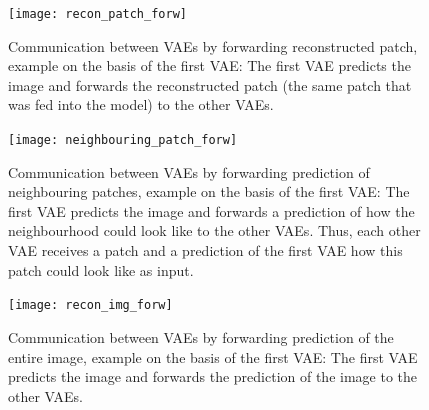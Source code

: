 \begin{figure}
    \centering
    \texttt{[image: recon\_patch\_forw]}
    \caption[Communication between VAEs by forwarding reconstructed patch]{Communication between VAEs by forwarding reconstructed patch, example on the basis of the first VAE: The first VAE predicts the image and forwards the reconstructed patch (the same patch that was fed into the model) to the other VAEs.}
\end{figure}

\begin{figure}
    \centering
    \texttt{[image: neighbouring\_patch\_forw]}
    \caption[Communication between VAEs by forwarding prediction of neighbouring patches]{Communication between VAEs by forwarding prediction of neighbouring patches, example on the basis of the first VAE: The first VAE predicts the image and forwards a prediction of how the neighbourhood could look like to the other VAEs. Thus, each other VAE receives a patch and a prediction of the first VAE how this patch could look like as input.}
\end{figure}

\begin{figure}
    \centering
    \texttt{[image: recon\_img\_forw]}
    \caption[Communication between VAEs by forwarding prediction of the entire image]{Communication between VAEs by forwarding prediction of the entire image, example on the basis of the first VAE: The first VAE predicts the image and forwards the prediction of the image to the other VAEs.}
\end{figure}



